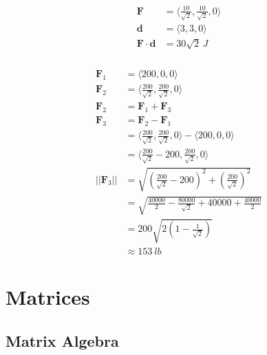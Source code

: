 \documentclass{article}
\begin{document}
\begin{align*}
  \mathbf{F}                  & = \langle \frac{10}{\sqrt{2}}, \frac{10}{\sqrt{2}}, 0 \rangle \\
  \mathbf{d}                  & = \langle 3, 3, 0 \rangle                                     \\
  \mathbf{F} \cdot \mathbf{d} & = 30 \sqrt{2} \,\unit{J}
\end{align*}

\setcounter{subsubsection}{46}
\subsubsection{}

\begin{align*}
  \mathbf{F}_1     & = \langle 200, 0, 0 \rangle                                                                  \\
  \mathbf{F}_2     & = \langle \frac{200}{\sqrt{2}}, \frac{200}{\sqrt{2}}, 0 \rangle                              \\
  \mathbf{F}_2     & = \mathbf{F}_1 + \mathbf{F}_3                                                                \\
  \mathbf{F}_3     & = \mathbf{F}_2 - \mathbf{F}_1                                                                \\
                   & = \langle \frac{200}{\sqrt{2}}, \frac{200}{\sqrt{2}}, 0 \rangle - \langle 200, 0, 0 \rangle  \\
                   & = \langle \frac{200}{\sqrt{2}} - 200, \frac{200}{\sqrt{2}}, 0 \rangle                        \\
  ||\mathbf{F}_3|| & = \sqrt{\left( \frac{200}{\sqrt{2}} - 200 \right)^2 + \left( \frac{200}{\sqrt{2}} \right)^2} \\
                   & = \sqrt{\frac{40000}{2} - \frac{80000}{\sqrt{2}} + 40000 + \frac{40000}{2}}                  \\
                   & = 200 \sqrt{2 \left( 1 - \frac{1}{\sqrt{2}} \right)}                                         \\
                   & \approx \qty{153}{lb}
\end{align*}

\section{Matrices}

\subsection{Matrix Algebra}
\end{document}
